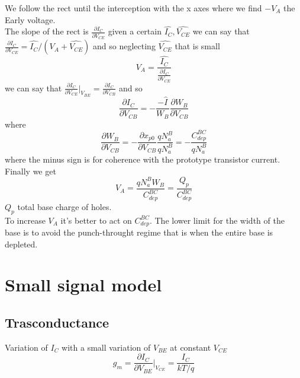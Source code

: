 We follow the rect until the interception with the x axes where we find $-V_A$ the Early voltage.\\
The slope of the rect is $\frac{\partial I_C}{\partial V_{CE}}$ given a certain $\hat{I_C},\hat{V_{CE}}$ we can say that $\frac{\partial I_C}{\partial V_{CE}}=\hat{I_C}/(V_A+\hat{V_{CE}})$ and so neglecting $\hat{V_{CE}}$ that is small
\begin{equation}
V_A=\frac{\hat{I_C}}{\frac{\partial I_C}{\partial V_{CE}}}
\end{equation}
we can say that $\frac{\partial I_C}{\partial V_{CE}}|_{V_{BE}}=\frac{\partial I_C}{\partial V_{CB}}$ and so
\begin{equation}
\frac{\partial I_C}{\partial V_{CB}}=-\frac{-\hat{I}}{W_B}\frac{\partial W_B }{\partial V_{CB}}
\end{equation}  
where
\begin{equation}
\frac{\partial W_B }{\partial V_{CB}}=-\frac{\partial x_{p0}}{\partial V_{CB}}\frac{qN_a^B}{qN_a^B}=-\frac{C_{dep}^{BC}}{qN_a^B}
\end{equation}
where the minus sign is for coherence with the prototype transistor current.
Finally we get
\begin{equation}
V_A=\frac{qN_a^BW_B}{C_{dep}^{BC}}=\frac{Q_p}{C_{dep}^{BC}}
\end{equation}
$Q_p$ total base charge of holes.\\
To increase $V_A$ it's better to act on $C_{dep}^{BC}$.
The lower limit for the width of the base is to avoid the punch-throught regime that is when the entire base is depleted.\\

\section{Small signal model}

\subsection{Trasconductance}
Variation of $I_C$ with a small variation of $V_{BE}$ at constant $V_{CE}$ 
\begin{equation}
g_m=\frac{\partial I_C}{\partial V_{BE}}|_{V_{CE}}=\frac{I_C}{kT/q}
\end{equation}

